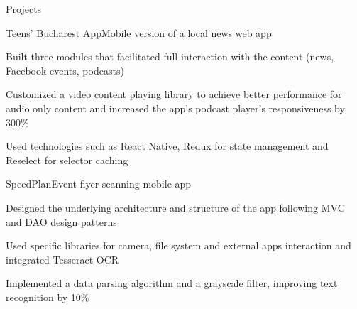 \documentclass{resume} %
\begin{document}
\begin{rSection}{Projects}

\begin{rSubsection}{Teens' Bucharest App}{Mobile version of a local news web app}{}{}
\item Built three modules that facilitated full interaction with the content (news, Facebook events, podcasts)
\item Customized a video content playing library to achieve better performance for audio only content and increased the app's podcast player's responsiveness by 300\%
\item Used technologies such as React Native, Redux for state management and Reselect for selector caching
\end{rSubsection}

\begin{rSubsection}{SpeedPlan}{Event flyer scanning mobile app}{}{}
\item Designed the underlying architecture and structure of the app following MVC and DAO design patterns
\item Used specific libraries for camera, file system and external apps interaction and integrated Tesseract OCR
\item Implemented a data parsing algorithm and a grayscale filter, improving text recognition by 10\%
\end{rSubsection}

\end{rSection}
\end{document}
